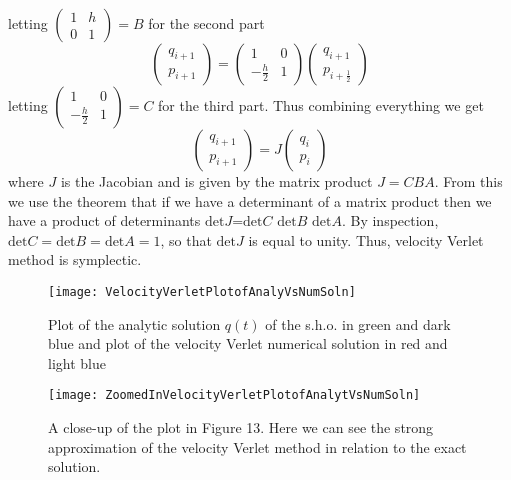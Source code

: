 \documentclass[12pt]{article}
\begin{document}
letting $\left(\begin{matrix} 1 & h \\ 0 & 1 \end{matrix}\right)=B$ for the second part
\[\left (\begin{matrix}
  q_{i+1}  \\
  p_{i+1} 
 \end{matrix}\right)=
\left(\begin{matrix}
  1 & 0 \\
  -\frac{h}{2} & 1 
 \end{matrix}\right)
\left(\begin{matrix}
  q_{i+1}  \\
  p_{i+\frac{1}{2}} 
 \end{matrix}\right)\]
letting $\left(\begin{matrix} 1 & 0 \\ -\frac{h}{2} & 1 \end{matrix}\right)=C$ for the third part. Thus combining everything we get
\[\left (\begin{matrix}
  q_{i+1}  \\
  p_{i+1} 
 \end{matrix}\right)=J\left(\begin{matrix}
  q_{i}  \\
  p_{i} 
 \end{matrix}\right)\]
where $J$ is the Jacobian and is given by the matrix product $J=CBA$. From this we use the theorem that if we have a determinant of a matrix product then we have a product of determinants $\text{det}J$=$\text{det}C$ $\text{det} B$ $\text{det} A$. By inspection, $\text{det} C=\text{det} B=\text{det} A=1$, so that $\text{det} J$ is equal to unity. Thus, velocity Verlet method is symplectic.\\
\begin{figure}[h!]
\begin{minipage}[b]{0.45\linewidth}
\centering
\texttt{[image: VelocityVerletPlotofAnalyVsNumSoln]}
\caption{Plot of the analytic solution $q(t)$ of the s.h.o. in green and dark blue and plot of the velocity Verlet numerical solution in red and light blue}
\label{fig:figure13}
\end{minipage}
\hspace{0.5cm}
\begin{minipage}[b]{0.45\linewidth}
\centering
\texttt{[image: ZoomedInVelocityVerletPlotofAnalytVsNumSoln]}
\caption{A close-up of the plot in Figure 13. Here we can see the strong approximation of the velocity Verlet method in relation to the exact solution.}
\label{fig:figure14}
\end{minipage}
\end{figure}
\end{document}
